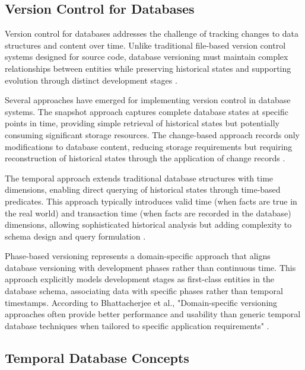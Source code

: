 \subsection{Version Control for Databases}
\label{subsec:database-versioning}

Version control for databases addresses the challenge of tracking changes to data structures and content over time. Unlike traditional file-based version control systems designed for source code, database versioning must maintain complex relationships between entities while preserving historical states and supporting evolution through distinct development stages \cite{bhattacherjee2015principles}.

Several approaches have emerged for implementing version control in database systems. The snapshot approach captures complete database states at specific points in time, providing simple retrieval of historical states but potentially consuming significant storage resources. The change-based approach records only modifications to database content, reducing storage requirements but requiring reconstruction of historical states through the application of change records \cite{bhattacherjee2015principles}.

The temporal approach extends traditional database structures with time dimensions, enabling direct querying of historical states through time-based predicates. This approach typically introduces valid time (when facts are true in the real world) and transaction time (when facts are recorded in the database) dimensions, allowing sophisticated historical analysis but adding complexity to schema design and query formulation \cite{snodgrass1999developing}.

Phase-based versioning represents a domain-specific approach that aligns database versioning with development phases rather than continuous time. This approach explicitly models development stages as first-class entities in the database schema, associating data with specific phases rather than temporal timestamps. According to Bhattacherjee et al., "Domain-specific versioning approaches often provide better performance and usability than generic temporal database techniques when tailored to specific application requirements" \cite{bhattacherjee2015principles}.


\subsection{Temporal Database Concepts}
\label{subsec:temporal-database-concepts}

